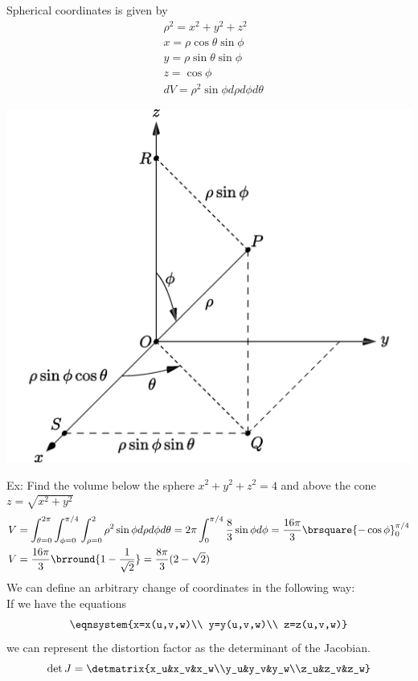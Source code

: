Spherical coordinates is given by
\begin{align*}
    &\rho^2=x^2+y^2+z^2\\
    &x=\rho\cos\theta\sin\phi\\
    &y=\rho\sin\theta\sin\phi\\
    &z=\cos\phi\\
    &dV=\rho^2\sin\phi d\rho d\phi d\theta
\end{align*}
\centerline{\includegraphics[scale=0.3]{Images/Math217Pictures/sphericalCoordinates.png}}
Ex: Find the volume below the sphere $x^2+y^2+z^2=4$ and above the cone $z=\sqrt{x^2+y^2}$
\begin{align*}
    &V=\int_{\theta=0}^{2\pi}\int_{\phi=0}^{\pi/4}\int_{\rho=0}^2\rho^2\sin\phi d\rho d\phi d\theta=2\pi\int_0^{\pi/4}\frac{8}{3}\sin\phi d\phi=\frac{16\pi}{3}\brsquare{-\cos\phi}_0^{\pi/4}\\
    &V=\frac{16\pi}{3}\brround{1-\frac{1}{\sqrt{2}}}=\frac{8\pi}{3}(2-\sqrt{2})
\end{align*}
We can define an arbitrary change of coordinates in the following way:\\
If we have the equations
$$\eqnsystem{x=x(u,v,w)\\ y=y(u,v,w)\\ z=z(u,v,w)}$$
we can represent the distortion factor as the determinant of the Jacobian.
$$\det J=\detmatrix{x_u&x_v&x_w\\y_u&y_v&y_w\\z_u&z_v&z_w}$$
